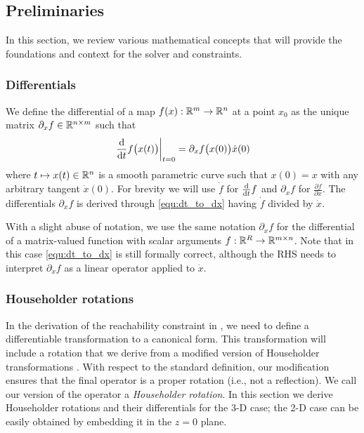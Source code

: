 \documentclass[journal]{IEEEtran}  %
\begin{document}
\subsection{Preliminaries}
In this section, we review various mathematical concepts that will provide the foundations and context for the solver and constraints.

\subsubsection{Differentials}
We define the differential of a map $f(x):\mathbb{R}^{m}{}\to\mathbb{R}^{n}{}$ at a point $x_0$ as the unique matrix $\partial_x f \in\mathbb{R}^{n\times m}{}$ such that
\begin{equation}\label{equ:dt_to_dx}
  \left.\frac{\mathrm{d} }{\mathrm{d} t} f\bigl(x(t)\bigr)\right|_{t=0}=\partial_x f\bigl(x(0)\bigr) \dot{x}(0)
\end{equation}
where $t\mapsto x(t)\in\mathbb{R}^{n}{}$ is a smooth parametric curve such that $x(0)=x$ with any arbitrary tangent $\dot{x}(0)$. For brevity we will use $\dot f$ for $\frac{\mathrm{d} }{\mathrm{d} t} f$ and $\partial_x f$ for $\frac{\partial f}{\partial x}$. The differentials $\partial_x f$ is derived through \eqref{equ:dt_to_dx} having $\dot f$ divided by $\dot x$.

With a slight abuse of notation, we use the same notation $\partial_xf$ for the differential of a matrix-valued function with scalar arguments $f:\mathbb{R}^{R}{}\to\mathbb{R}^{m\times n}{}$.  Note that in this case \eqref{equ:dt_to_dx} is still formally correct, although the RHS needs to interpret $\partial_x f$ as a linear operator applied to $\dot{x}$.

 \subsubsection{Householder rotations}\label{sec:householder}
 In the derivation of the reachability constraint in , we need to define a differentiable transformation to a canonical form. This transformation will include a rotation that we derive from a modified version of Householder transformations \cite{householder1958unitary}. With respect to the standard definition, our modification ensures that the final operator is a proper rotation (i.e., not a reflection). We call our version of the operator a \emph{Householder rotation}. In this section we derive Householder rotations and their differentials for the 3-D case; the 2-D case can be easily obtained by embedding it in the $z=0$ plane.
\end{document}
